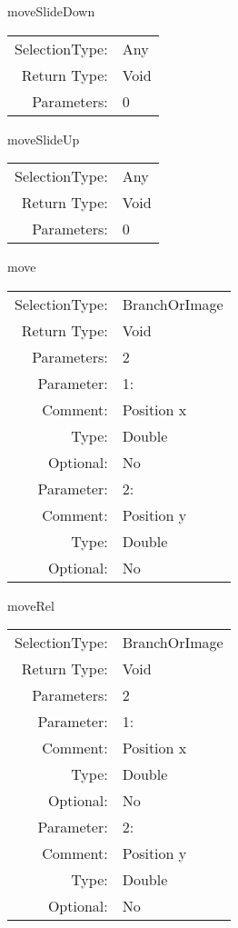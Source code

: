 \item moveSlideDown\\
\begin{tabular}{rl}
  SelectionType: & Any\\
    Return Type: & Void\\
     Parameters: & 0\\
\end{tabular}

\item moveSlideUp\\
\begin{tabular}{rl}
  SelectionType: & Any\\
    Return Type: & Void\\
     Parameters: & 0\\
\end{tabular}

\item move\\
\begin{tabular}{rl}
  SelectionType: & BranchOrImage\\
    Return Type: & Void\\
     Parameters: & 2\\
   Parameter: &  1:\\
        Comment: & Position x\\
           Type: & Double\\
       Optional: &  No\\
   Parameter: &  2:\\
        Comment: & Position y\\
           Type: & Double\\
       Optional: &  No\\
\end{tabular}

\item moveRel\\
\begin{tabular}{rl}
  SelectionType: & BranchOrImage\\
    Return Type: & Void\\
     Parameters: & 2\\
   Parameter: &  1:\\
        Comment: & Position x\\
           Type: & Double\\
       Optional: &  No\\
   Parameter: &  2:\\
        Comment: & Position y\\
           Type: & Double\\
       Optional: &  No\\
\end{tabular}

